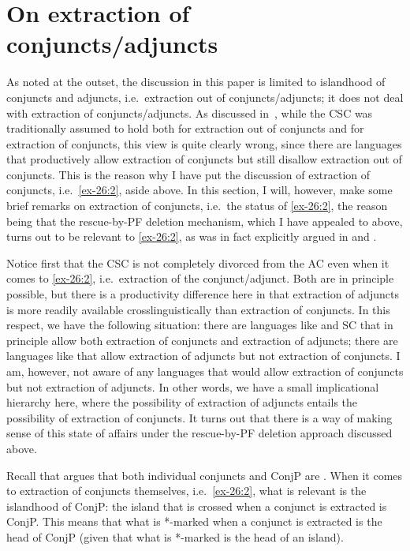 \documentclass[output=paper]{langsci/langscibook}
\begin{document}
\section{On extraction of conjuncts/adjuncts}\label{sec:35.5}

As noted at the outset, the discussion in this paper is limited to islandhood
of conjuncts and adjuncts, i.e.\ extraction out of
conjuncts/adjuncts; it does not deal with extraction of conjuncts/adjuncts. As
discussed in~, while the \gls{CSC} was traditionally assumed to
hold both for extraction out of conjuncts and for extraction of conjuncts, this
view is quite clearly wrong, since there are languages that productively allow
extraction of conjuncts but still disallow extraction out of conjuncts. This is
the reason why I have put the discussion of extraction of conjuncts, i.e.\
\eqref{ex-26:2}, aside above. In this section, I will, however, make some brief
remarks on extraction of conjuncts, i.e.\ the status of \eqref{ex-26:2}, the
reason being that the rescue-by-\gls{PF} deletion mechanism, which I have
appealed to above, turns out to be relevant to \eqref{ex-26:2}, as was in fact
explicitly argued in \textcite{Stjepanovic2014} and \textcite{Oda:2017}.

Notice first that the \gls{CSC} is not
completely divorced from the \gls{AC} even when it comes to \eqref{ex-26:2}, i.e.\
extraction of the conjunct/adjunct. Both are in principle possible, but there
is a productivity difference here in that extraction of adjuncts\is{adjunction}
is more readily available crosslinguistically than extraction of conjuncts. In
this respect, we have the following situation: there are languages like
\ili{Japanese} and \gls{SC} that in principle allow both extraction of
conjuncts and extraction of adjuncts; there are languages like 
that allow extraction of adjuncts but not extraction of
conjuncts.  I am, however, not aware of any languages that would allow
extraction of conjuncts but not extraction of adjuncts\is{adjunction}. In other
words, we have a small implicational hierarchy here, where the possibility of
extraction of adjuncts entails the possibility of extraction of conjuncts. It
turns out that there is a way of making sense of this state of affairs under
the rescue-by-\gls{PF} deletion approach discussed above.

Recall that \textcite{Oda:2017} argues that both individual conjuncts and ConjP
are . When it comes to extraction of conjuncts themselves, i.e.\
\eqref{ex-26:2}, what is relevant is the islandhood of ConjP: the
island that is crossed when a conjunct is extracted is ConjP. This means that
what is *-marked when a conjunct is extracted is the head of ConjP (given that
what is *-marked is the head of an island).
\end{document}
